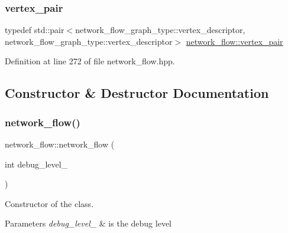\mbox{\label{classnetwork__flow_a7a59f52da10f126268707c9097a37442}} 
\subsubsection{\texorpdfstring{vertex\+\_\+pair}{vertex\_pair}}
{\footnotesize\ttfamily typedef std\+::pair$<$network\+\_\+flow\+\_\+graph\+\_\+type\+::vertex\+\_\+descriptor, network\+\_\+flow\+\_\+graph\+\_\+type\+::vertex\+\_\+descriptor$>$ \hyperlink{classnetwork__flow_a7a59f52da10f126268707c9097a37442}{network\+\_\+flow\+::vertex\+\_\+pair}\hspace{0.3cm}{\ttfamily [private]}}



Definition at line 272 of file network\+\_\+flow.\+hpp.



\subsection{Constructor \& Destructor Documentation}
\mbox{\label{classnetwork__flow_a3872d37640e79a5a7bdb865421f17eff}} 
\subsubsection{\texorpdfstring{network\+\_\+flow()}{network\_flow()}}
{\footnotesize\ttfamily network\+\_\+flow\+::network\+\_\+flow (\begin{DoxyParamCaption}\item[{int}]{debug\+\_\+level\+\_\+ }\end{DoxyParamCaption})\hspace{0.3cm}{\ttfamily [explicit]}}



Constructor of the class. 


\begin{DoxyParams}{Parameters}
{\em debug\+\_\+level\+\_\+} & is the debug level \\
\hline
\end{DoxyParams}


